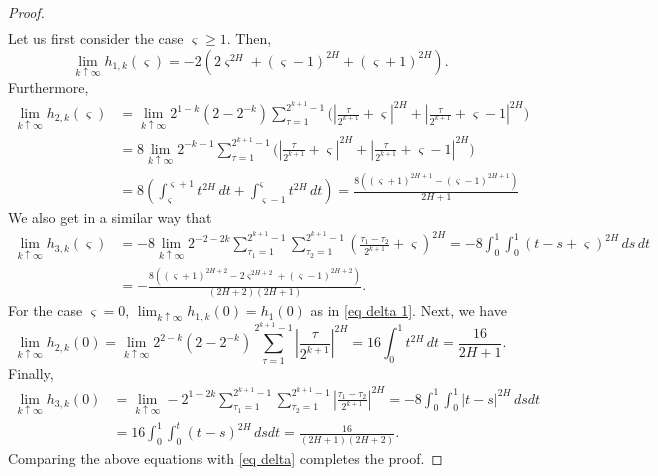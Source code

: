 \documentclass[12pt,reqno]{article}
\def\ua{\uparrow}
\numberwithin{equation}{section}
\theoremstyle{definition}
\def\ua{\uparrow}
\begin{document}
\begin{proof}
\begin{equation*}
\begin{split}
\end{split}
\end{equation*}
Let us first consider the case $\varsigma \ge 1$. Then,
\begin{equation}\label{eq delta 1}
\lim_{k \ua \infty}h_{1,k}(\varsigma) = -2\left(2\varsigma^{2H} + (\varsigma-1)^{2H}+(\varsigma+1)^{2H}\right).
\end{equation} 
Furthermore, 
\begin{equation*}
\begin{split}
\lim_{k \ua \infty}h_{2,k}(\varsigma)&= \lim_{k \ua \infty}2^{1-k}(2-2^{-k})\sum_{\tau = 1}^{2^{k+1}-1}\Big(\left|\frac{\tau}{2^{k+1}} + \varsigma\right|^{2H}+ \left|\frac{\tau}{2^{k+1}}+\varsigma-1\right|^{2H}\Big)\\&= 8\lim_{k \ua \infty}2^{-k-1}\sum_{\tau = 1}^{2^{k+1}-1}\Big(\left|\frac{\tau}{2^{k+1}} + \varsigma\right|^{2H}+ \left|\frac{\tau}{2^{k+1}}+\varsigma-1\right|^{2H}\Big)\\&= 8 \left(\int_{\varsigma}^{\varsigma+1}t^{2H}\,dt + \int_{\varsigma-1}^{\varsigma}t^{2H}\,dt\right)= \frac{8\left((\varsigma+1)^{2H+1} - (\varsigma-1)^{2H+1}\right)}{2H+1}
\end{split}
\end{equation*}
We also get in a similar way that
\begin{equation*}
\begin{split}
\lim_{k \ua \infty}h_{3,k}(\varsigma) &= -8\lim_{k \ua \infty}2^{-2-2k}\sum_{\tau_1 = 1}^{2^{k+1}-1}\sum_{\tau_2 = 1}^{2^{k+1}-1}\left(\frac{\tau_1-\tau_2}{2^{k+1}} + \varsigma\right)^{2H}=-8 \int_{0}^{1}\int_{0}^{1}\left(t-s+\varsigma\right)^{2H}\,ds\,dt\\& = -\frac{8\left((\varsigma+1)^{2H+2}-2\varsigma^{2H+2}+(\varsigma-1)^{2H+2}\right)}{(2H+2)(2H+1)}.
\end{split}
\end{equation*}   
For the case $\varsigma = 0$, $\lim_{k \ua \infty}h_{1,k}(0) = h_1(0)$ as in \eqref{eq delta 1}. Next, we have 
\begin{equation*}
\lim_{k \ua \infty}h_{2,k}(0) = \lim_{k \ua \infty}2^{2-k}(2-2^{-k})\sum_{\tau = 1}^{2^{k+1}-1}\left|\frac{\tau}{2^{k+1}}\right|^{2H} = 16\int_{0}^{1}t^{2H}\,dt = \frac{16}{2H+1}.
\end{equation*}
Finally, 
\begin{equation*}
\begin{split}
\lim_{k \ua \infty}h_{3,k}(0) &= \lim_{k \ua \infty}-2^{1-2k}\sum_{\tau_1 = 1}^{2^{k+1}-1}\sum_{\tau_2 = 1}^{2^{k+1}-1}\left|\frac{\tau_1-\tau_2}{2^{k+1}}\right|^{2H} = -8\int_{0}^{1}\int_{0}^{1}|t-s|^{2H}\,dsdt \\&= 16\int_{0}^{1}\int_{0}^{t}(t-s)^{2H}\,dsdt = \frac{16}{(2H+1)(2H+2)}.
\end{split}
\end{equation*}
Comparing the above equations with \eqref{eq delta} completes the proof.
\end{proof}
\end{document}
